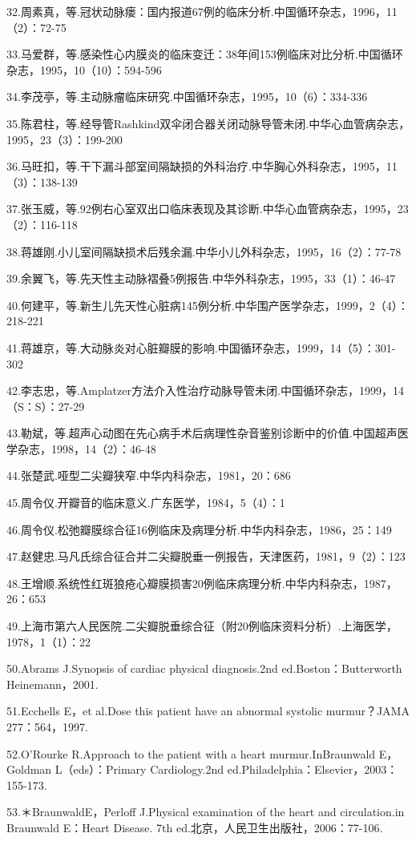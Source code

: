 32.周素真，等.冠状动脉瘘：国内报道67例的临床分析.中国循环杂志，1996，11（2）：72-75

33.马爱群，等.感染性心内膜炎的临床变迁：38年间153例临床对比分析.中国循环杂志，1995，10（10）：594-596

34.李茂亭，等.主动脉瘤临床研究.中国循环杂志，1995，10（6）：334-336

35.陈君柱，等.经导管Rashkind双伞闭合器关闭动脉导管未闭.中华心血管病杂志，1995，23（3）：199-200

36.马旺扣，等.干下漏斗部室间隔缺损的外科治疗.中华胸心外科杂志，1995，11（3）：138-139

37.张玉威，等.92例右心室双出口临床表现及其诊断.中华心血管病杂志，1995，23（2）：116-118

38.蒋雄刚.小儿室间隔缺损术后残余漏.中华小儿外科杂志，1995，16（2）：77-78

39.余翼飞，等.先天性主动脉褶叠5例报告.中华外科杂志，1995，33（1）：46-47

40.何建平，等.新生儿先天性心脏病145例分析.中华围产医学杂志，1999，2（4）：218-221

41.蒋雄京，等.大动脉炎对心脏瓣膜的影响.中国循环杂志，1999，14（5）：301-302

42.李志忠，等.Amplatzer方法介入性治疗动脉导管未闭.中国循环杂志，1999，14（S：S）：27-29

43.勒斌，等.超声心动图在先心病手术后病理性杂音鉴别诊断中的价值.中国超声医学杂志，1998，14（2）：46-48

44.张楚武.哑型二尖瓣狭窄.中华内科杂志，1981，20：686

45.周令仪.开瓣音的临床意义.广东医学，1984，5（4）：1

46.周令仪.松弛瓣膜综合征16例临床及病理分析.中华内科杂志，1986，25：149

47.赵健忠.马凡氏综合征合并二尖瓣脱垂一例报告，天津医药，1981，9（2）：123

48.王增顺.系统性红斑狼疮心瓣膜损害20例临床病理分析.中华内科杂志，1987，26：653

49.上海市第六人民医院.二尖瓣脱垂综合征（附20例临床资料分析）.上海医学，1978，1（1）：22

50.Abrams J.Synopsis of cardiac physical diagnosis.2nd
ed.Boston：Butterworth Heinemann，2001.

51.Ecchells E，et al.Dose this patient have an abnormal systolic
murmur？JAMA 277：564，1997.

52.O'Rourke R.Approach to the patient with a heart murmur.InBraunwald
E，Goldman L（eds）：Primary Cardiology.2nd
ed.Philadelphia：Elsevier，2003：155-173.

53.＊BraunwaldE，Perloff J.Physical examination of the heart and
circulation.in Braunwald E：Heart Disease. 7th
ed.北京，人民卫生出版社，2006：77-106.

\protect\hypertarget{text00133.html}{}{}

